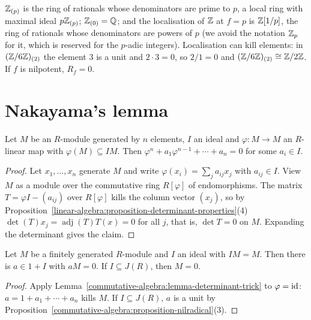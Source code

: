 \begin{example}\label{commutative-algebra:example-localisations}
$\mathbb{Z}_{(p)}$ is the ring of rationals whose denominators are prime to $p$, a local ring with maximal ideal
$p\mathbb{Z}_{(p)}$; $\mathbb{Z}_{(0)} = \mathbb{Q}$; and the localisation of $\mathbb{Z}$ at $f = p$ is $\mathbb{Z}[1/p]$, the ring of rationals whose
denominators are powers of $p$ (we avoid the notation $\mathbb{Z}_p$ for it, which is reserved for the $p$-adic integers). Localisation can kill elements: in $(\mathbb{Z}/6\mathbb{Z})_{(2)}$ the element $3$ is a unit and $2 \cdot 3 = 0$, so
$2/1 = 0$ and $(\mathbb{Z}/6\mathbb{Z})_{(2)} \cong \mathbb{Z}/2\mathbb{Z}$. If $f$ is nilpotent, $R_f = 0$.
\end{example}

\section{Nakayama's lemma}\label{commutative-algebra:section-nakayama}

\begin{lemma}\label{commutative-algebra:lemma-determinant-trick}
Let $M$ be an $R$-module generated by $n$ elements, $I$ an ideal and $\varphi \colon M \to M$ an $R$-linear map with
$\varphi(M) \subseteq IM$. Then $\varphi^n + a_1\varphi^{n-1} + \cdots + a_n = 0$ for some $a_i \in I$.
\end{lemma}

\begin{proof}
Let $x_1, \ldots, x_n$ generate $M$ and write $\varphi(x_i) = \sum_j a_{ij}x_j$ with $a_{ij} \in I$. View $M$ as a module over
the commutative ring $R[\varphi]$ of endomorphisms. The matrix $T = \varphi I - (a_{ij})$ over $R[\varphi]$ kills the column
vector $(x_j)$, so by Proposition~\ref{linear-algebra:proposition-determinant-properties}(4)
$\det(T) x_j = \operatorname{adj}(T)T(x) = 0$ for all $j$, that is, $\det T = 0$ on $M$. Expanding the determinant gives the
claim.
\end{proof}

\begin{theorem}\label{commutative-algebra:theorem-nakayama}
Let $M$ be a finitely generated $R$-module and $I$ an ideal with $IM = M$. Then there is $a \in 1 + I$ with $aM = 0$. If
$I \subseteq J(R)$, then $M = 0$.
\end{theorem}

\begin{proof}
Apply Lemma~\ref{commutative-algebra:lemma-determinant-trick} to $\varphi = \mathrm{id}$: $a = 1 + a_1 + \cdots + a_n$ kills $M$. If
$I \subseteq J(R)$, $a$ is a unit by Proposition~\ref{commutative-algebra:proposition-nilradical}(3).
\end{proof}

